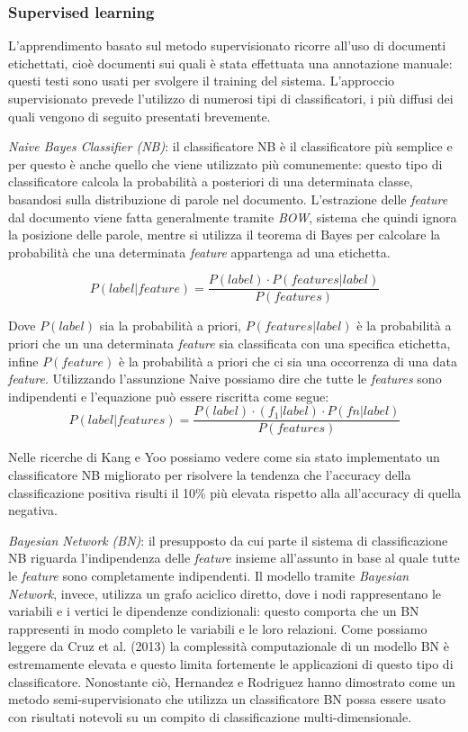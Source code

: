 \documentclass[a4paper,12pt,openright,twoside]{report}
\theoremstyle{definition}
\begin{document}
\subsubsection{Supervised learning}
L’apprendimento basato sul metodo supervisionato ricorre all'uso di documenti etichettati,
cioè documenti sui quali è stata effettuata una annotazione manuale: questi 
testi sono usati
per svolgere il training del sistema. L'approccio supervisionato prevede l'utilizzo
di numerosi tipi di classificatori, i più diffusi dei quali vengono di seguito
presentati brevemente.

\emph{Naive Bayes Classifier (NB)}: il classificatore NB è il classificatore più semplice
e per questo è anche quello che viene utilizzato più comunemente: questo tipo di classificatore calcola
la probabilità a posteriori di una determinata classe, basandosi sulla distribuzione
di parole nel documento. L'estrazione delle \emph{feature} dal documento viene fatta
generalmente 
tramite \emph{BOW}, sistema che quindi ignora la posizione delle parole, mentre si utilizza il
teorema di Bayes per calcolare la probabilità che una determinata \emph{feature}
appartenga ad una etichetta.

\begin{equation}
	P(label|feature)=\frac{P(label)\cdot{}P(features|label)}{P(features)}
	\label{Bayes}
\end{equation}

Dove $P(label)$ sia la probabilità a priori, $P(features|label)$ è
la probabilità a priori che un una determinata \emph{feature} sia
classificata con una specifica etichetta, infine $P(feature)$
è la probabilità a priori che ci sia una occorrenza di una data
\emph{feature}. Utilizzando l'assunzione Naive possiamo dire che tutte le \emph{features} sono indipendenti
e l'equazione può essere riscritta come segue:
\begin{equation}
	P(label|features)=\frac{P(label)\cdot{}(f_1|label)\cdot{}P(fn|label)}{P(features)}
	\label{Naive Bayes}
\end{equation}

Nelle ricerche di Kang e Yoo %
possiamo vedere come sia stato implementato un classificatore NB migliorato per risolvere
la tendenza che l'accuracy della classificazione positiva risulti il 10\% più elevata rispetto alla
all'accuracy di quella negativa.

\emph{Bayesian Network (BN)}: il presupposto da cui parte il sistema di classificazione NB riguarda
l'indipendenza delle \emph{feature} insieme all'assunto in base al quale tutte le \emph{feature}
sono completamente indipendenti. Il modello tramite \emph{Bayesian Network}, invece, utilizza
un grafo aciclico diretto, dove i nodi rappresentano le variabili e i vertici le dipendenze condizionali:
 questo
comporta che un BN rappresenti in modo completo le variabili e le loro relazioni.
Come possiamo leggere da Cruz et al. (2013) la complessità computazionale di un modello BN 
è estremamente
elevata e questo limita fortemente le applicazioni di questo tipo di classificatore.
Nonostante ciò, Hernandez e Rodriguez %
hanno dimostrato come un metodo semi-supervisionato che utilizza un classificatore BN possa essere
usato con risultati notevoli su un compito di classificazione multi-dimensionale.
\end{document}
